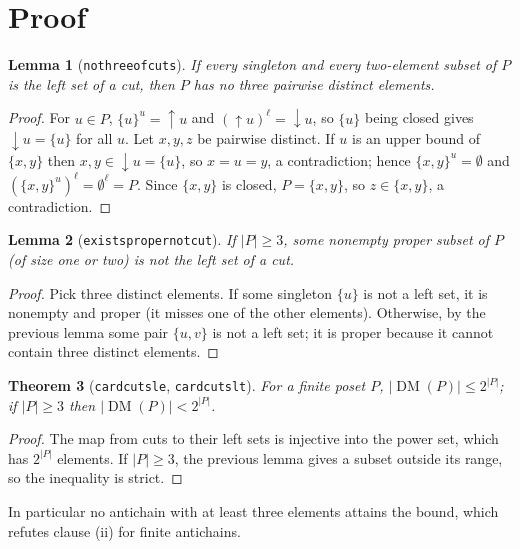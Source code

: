 \documentclass[11pt]{article}
\newtheorem{theorem}{Theorem}
\newtheorem{lemma}[theorem]{Lemma}
\theoremstyle{definition}
\theoremstyle{remark}
\renewcommand{\_}{\oldus\allowbreak}
\newcommand{\DM}{\operatorname{DM}}
\begin{document}
\section{Proof}

\begin{lemma}[\texttt{no\_three\_of\_cuts}]
If every singleton and every two-element subset of $P$ is the left set of a cut, then $P$ has no three
pairwise distinct elements.
\end{lemma}

\begin{proof}
For $u \in P$, $\{u\}^u = {\uparrow}u$ and $({\uparrow}u)^\ell = {\downarrow}u$, so $\{u\}$ being closed
gives ${\downarrow}u = \{u\}$ for all $u$. Let $x, y, z$ be pairwise distinct. If $u$ is an upper bound of
$\{x, y\}$ then $x, y \in {\downarrow}u = \{u\}$, so $x = u = y$, a contradiction; hence $\{x,y\}^u =
\emptyset$ and $(\{x,y\}^u)^\ell = \emptyset^\ell = P$. Since $\{x,y\}$ is closed, $P = \{x, y\}$, so
$z \in \{x, y\}$, a contradiction.
\end{proof}

\begin{lemma}[\texttt{exists\_proper\_not\_cut}]
If $|P| \ge 3$, some nonempty proper subset of $P$ (of size one or two) is not the left set of a cut.
\end{lemma}

\begin{proof}
Pick three distinct elements. If some singleton $\{u\}$ is not a left set, it is nonempty and proper
(it misses one of the other elements). Otherwise, by the previous lemma some pair $\{u, v\}$ is not a
left set; it is proper because it cannot contain three distinct elements.
\end{proof}

\begin{theorem}[\texttt{card\_cuts\_le}, \texttt{card\_cuts\_lt}]
For a finite poset $P$, $|\DM(P)| \le 2^{|P|}$; if $|P| \ge 3$ then $|\DM(P)| < 2^{|P|}$.
\end{theorem}

\begin{proof}
The map from cuts to their left sets is injective into the power set, which has $2^{|P|}$ elements. If
$|P| \ge 3$, the previous lemma gives a subset outside its range, so the inequality is strict.
\end{proof}

In particular no antichain with at least three elements attains the bound, which refutes clause (ii) for
finite antichains.
\end{document}
